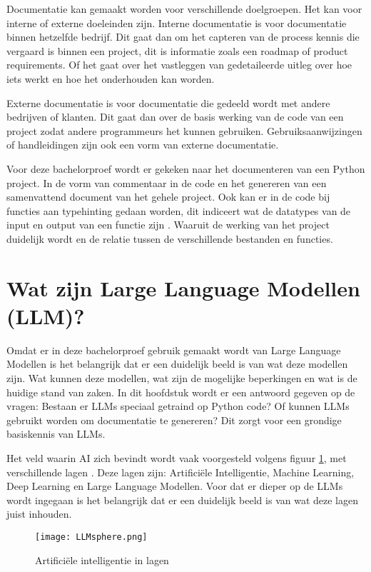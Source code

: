 Documentatie kan gemaakt worden voor verschillende doelgroepen. Het kan voor interne of externe doeleinden zijn.
Interne documentatie is voor documentatie binnen hetzelfde bedrijf.
Dit gaat dan om het capteren van de process kennis die vergaard is binnen een project, dit is informatie zoals een roadmap of product requirements. 
Of het gaat over het vastleggen van gedetaileerde uitleg over hoe iets werkt en hoe het onderhouden kan worden.

Externe documentatie is voor documentatie die gedeeld wordt met andere bedrijven of klanten. 
Dit gaat dan over de basis werking van de code van een project zodat andere programmeurs het kunnen gebruiken.
Gebruiksaanwijzingen of handleidingen zijn ook een vorm van externe documentatie. \autocite{swimm.io2024}

Voor deze bachelorproef wordt er gekeken naar het documenteren van een Python project.
In de vorm van commentaar in de code en het genereren van een samenvattend document van het gehele project.
Ook kan er in de code bij functies aan typehinting gedaan worden, dit indiceert wat de datatypes van de input en output van een functie zijn \autocite{Bailey2024}.
Waaruit de werking van het project duidelijk wordt en de relatie tussen de verschillende bestanden en functies.

\section{Wat zijn Large Language Modellen (LLM)?}
\label{sec:wat-zijn-llms}

Omdat er in deze bachelorproef gebruik gemaakt wordt van Large Language Modellen is het belangrijk dat er een duidelijk beeld is van wat deze modellen zijn.
Wat kunnen deze modellen, wat zijn de mogelijke beperkingen en wat is de huidige stand van zaken. 
In dit hoofdstuk wordt er een antwoord gegeven op de vragen: Bestaan er LLMs speciaal getraind op Python code? Of kunnen LLMs gebruikt worden om documentatie te genereren?
Dit zorgt voor een grondige basiskennis van LLMs. 

Het veld waarin AI zich bevindt wordt vaak voorgesteld volgens figuur \ref{fig:LLM-position}, met verschillende lagen \autocite{Stoeffelbauer2023}.
Deze lagen zijn: Artificiële Intelligentie, Machine Learning, Deep Learning en Large Language Modellen.
Voor dat er dieper op de LLMs wordt ingegaan is het belangrijk dat er een duidelijk beeld is van wat deze lagen juist inhouden.

\begin{figure}[h]
  \centering
  \texttt{[image: LLMsphere.png]}
  \caption{Artificiële intelligentie in lagen \autocite{Stoeffelbauer2023}}
  \label{fig:LLM-position}
\end{figure}

